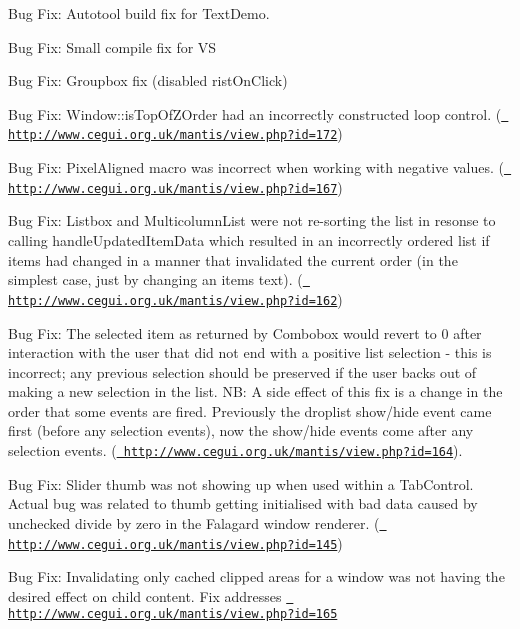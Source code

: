 \begin{DoxyItemize}
\item Bug Fix\+: Autotool build fix for Text\+Demo.
\item Bug Fix\+: Small compile fix for VS
\item Bug Fix\+: Groupbox fix (disabled \textquotesingle{}rist\+On\+Click\textquotesingle{})
\item Bug Fix\+: Window\+::is\+Top\+Of\+Z\+Order had an incorrectly constructed loop control. (\href{http://www.cegui.org.uk/mantis/view.php?id=172}{\texttt{ http\+://www.\+cegui.\+org.\+uk/mantis/view.\+php?id=172}})
\item Bug Fix\+: Pixel\+Aligned macro was incorrect when working with negative values. (\href{http://www.cegui.org.uk/mantis/view.php?id=167}{\texttt{ http\+://www.\+cegui.\+org.\+uk/mantis/view.\+php?id=167}})
\item Bug Fix\+: Listbox and Multicolumn\+List were not re-\/sorting the list in resonse to calling handle\+Updated\+Item\+Data which resulted in an incorrectly ordered list if items had changed in a manner that invalidated the current order (in the simplest case, just by changing an items text). (\href{http://www.cegui.org.uk/mantis/view.php?id=162}{\texttt{ http\+://www.\+cegui.\+org.\+uk/mantis/view.\+php?id=162}})
\item Bug Fix\+: The \textquotesingle{}selected item\textquotesingle{} as returned by Combobox would revert to 0 after interaction with the user that did not end with a positive list selection -\/ this is incorrect; any previous selection should be preserved if the user backs out of making a new selection in the list. NB\+: A side effect of this fix is a change in the order that some events are fired. Previously the droplist show/hide event came first (before any selection events), now the show/hide events come after any selection events. (\href{http://www.cegui.org.uk/mantis/view.php?id=164}{\texttt{ http\+://www.\+cegui.\+org.\+uk/mantis/view.\+php?id=164}}).
\item Bug Fix\+: Slider thumb was not showing up when used within a Tab\+Control. Actual bug was related to thumb getting initialised with bad data caused by unchecked divide by zero in the Falagard window renderer. (\href{http://www.cegui.org.uk/mantis/view.php?id=145}{\texttt{ http\+://www.\+cegui.\+org.\+uk/mantis/view.\+php?id=145}})
\item Bug Fix\+: Invalidating only cached clipped areas for a window was not having the desired effect on child content. Fix addresses \href{http://www.cegui.org.uk/mantis/view.php?id=165}{\texttt{ http\+://www.\+cegui.\+org.\+uk/mantis/view.\+php?id=165}}

\end{DoxyItemize}
